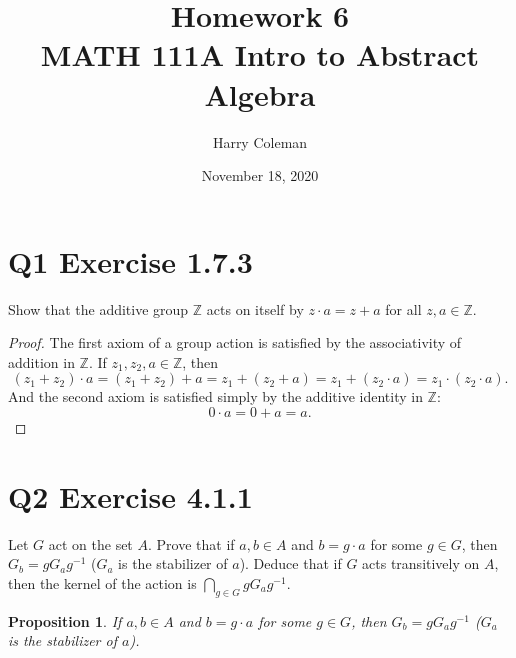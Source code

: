 \documentclass[12pt]{article}
\newtheorem{proposition}{Proposition}
\newenvironment{problem}
    {\begin{lrbox}{\mybox}\begin{minipage}{0.98\textwidth}}
    {\end{minipage}\end{lrbox}\framebox[\textwidth]{\usebox{\mybox}}}
\newcommand{\ds}{\displaystyle}
\newcommand{\Z}{\mathbb{Z}} %
\newcommand{\<}{\left\langle} %
\renewcommand{\>}{\right\rangle} %
\begin{document}
 
\title{Homework 6\\
    \large MATH 111A Intro to Abstract Algebra
}
\author{Harry Coleman}
\date{November 18, 2020}
\maketitle

\section*{Q1 Exercise 1.7.3}
\begin{problem}
    Show that the additive group $\Z$ acts on itself by $z\cdot a = z + a$ for all $z,a\in\Z$.
\end{problem}

\begin{proof}
    The first axiom of a group action is satisfied by the associativity of addition in $\Z$. If $z_1,z_2,a\in\Z$, then
    \[(z_1 + z_2) \cdot a = (z_1 + z_2) + a = z_1 + (z_2 + a) = z_1 + (z_2\cdot a) = z_1\cdot(z_2\cdot a).\]
    And the second axiom is satisfied simply by the additive identity in $\Z$:
    \[0\cdot a = 0 + a = a.\]
    
\end{proof}

\newpage
\section*{Q2 Exercise 4.1.1}
\begin{problem}
    Let $G$ act on the set $A$. Prove that if $a,b\in A$ and $b= g\cdot a$ for some $g\in G$, then $G_b = gG_ag^{-1}$ ($G_a$ is the stabilizer of $a$). Deduce that if $G$ acts transitively on $A$, then the kernel of the action is $\ds\bigcap_{g\in G} gG_ag^{-1}$.
\end{problem}

\begin{proposition}
    If $a,b\in A$ and $b= g\cdot a$ for some $g\in G$, then $G_b = gG_ag^{-1}$ ($G_a$ is the stabilizer of $a$).
\end{proposition}
\end{document}
